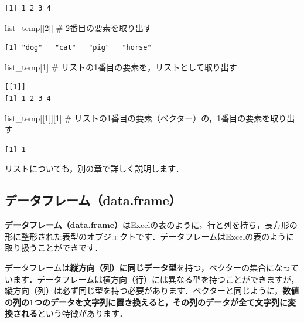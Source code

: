 \documentclass[
  letterpaper,
  DIV=11,
  numbers=noendperiod]{scrreprt}
\newenvironment{Shaded}{\begin{snugshade}}{\end{snugshade}}
\newcommand{\CommentTok}[1]{\textcolor[rgb]{0.37,0.37,0.37}{#1}}
\newcommand{\DecValTok}[1]{\textcolor[rgb]{0.68,0.00,0.00}{#1}}
\newcommand{\NormalTok}[1]{\textcolor[rgb]{0.00,0.23,0.31}{#1}}
\begin{document}
\begin{verbatim}
[1] 1 2 3 4
\end{verbatim}

\begin{Shaded}
\begin{Highlighting}[]
\NormalTok{list\_temp[[}\DecValTok{2}\NormalTok{]] }\CommentTok{\# 2番目の要素を取り出す}
\end{Highlighting}
\end{Shaded}

\begin{verbatim}
[1] "dog"   "cat"   "pig"   "horse"
\end{verbatim}

\begin{Shaded}
\begin{Highlighting}[]
\NormalTok{list\_temp[}\DecValTok{1}\NormalTok{] }\CommentTok{\# リストの1番目の要素を，リストとして取り出す}
\end{Highlighting}
\end{Shaded}

\begin{verbatim}
[[1]]
[1] 1 2 3 4
\end{verbatim}

\begin{Shaded}
\begin{Highlighting}[]
\NormalTok{list\_temp[[}\DecValTok{1}\NormalTok{]][}\DecValTok{1}\NormalTok{] }\CommentTok{\# リストの1番目の要素（ベクター）の，1番目の要素を取り出す}
\end{Highlighting}
\end{Shaded}

\begin{verbatim}
[1] 1
\end{verbatim}

リストについても，別の章で詳しく説明します．

\hypertarget{ux30c7ux30fcux30bfux30d5ux30ecux30fcux30e0data.frame}{%
\subsection{データフレーム（data.frame）}\label{ux30c7ux30fcux30bfux30d5ux30ecux30fcux30e0data.frame}}

\textbf{データフレーム（data.frame）}はExcelの表のように，行と列を持ち，長方形の形に整形された表型のオブジェクトです．データフレームはExcelの表のように取り扱うことができです．

データフレームは\textbf{縦方向（列）に同じデータ型}を持つ，ベクターの集合になっています．データフレームは横方向（行）には異なる型を持つことができますが，縦方向（列）は必ず同じ型を持つ必要があります．ベクターと同じように，\textbf{数値の列の1つのデータを文字列に置き換えると，その列のデータが全て文字列に変換される}という特徴があります．
\end{document}
